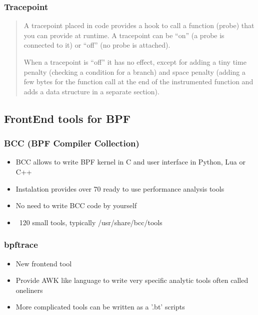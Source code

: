 \documentclass{beamer}
\begin{document}
\begin{frame}
  \frametitle{Tracepoint}
  \begin{quotation}
    \small A tracepoint placed in code provides a hook to call a function (probe) that you can provide at runtime. A tracepoint can be “on” (a probe is connected to it) or “off” (no probe is attached). 
   
    \small When a tracepoint is “off” it has no effect, except for adding a tiny time penalty (checking a condition for a branch) and space penalty (adding a few bytes for the function call at the end of the instrumented function and adds a data structure in a separate section). 
  \end{quotation}
\end{frame}


\subsection{FrontEnd tools for BPF}
\begin{frame}
  \frametitle{BCC (BPF Compiler Collection)}
  \begin{itemize}
    \item<+-> BCC allows to write BPF kernel in C and user interface in Python, Lua or C++
    \item<+-> Instalation provides over 70 ready to use performance analysis tools
    \item<+-> No need to write BCC code by yourself
    \item<+-> ~120 small tools, typically /usr/share/bcc/tools
  \end{itemize}
\end{frame}


\begin{frame}
  \frametitle{bpftrace}
  \begin{itemize}
    \item<+-> New frontend tool
    \item<+-> Provide AWK like language to write very specific analytic tools often called oneliners
    \item<+-> More complicated tools can be written as a '.bt' scripts
  \end{itemize}
\end{frame}
\end{document}
